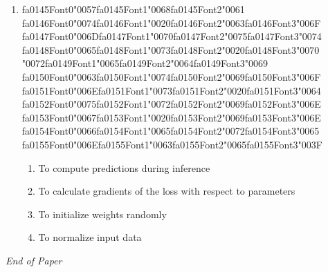 \documentclass[12pt]{article}
\begin{document}
\begin{enumerate}[label=Q\arabic*.]
\item {\csname fa0145Font0\endcsname\char"0057}{\csname fa0145Font1\endcsname\char"0068}{\csname fa0145Font2\endcsname\char"0061} {\csname fa0146Font0\endcsname\char"0074}{\csname fa0146Font1\endcsname\char"0020}{\csname fa0146Font2\endcsname\char"0063}{\csname fa0146Font3\endcsname\char"006F} {\csname fa0147Font0\endcsname\char"006D}{\csname fa0147Font1\endcsname\char"0070}{\csname fa0147Font2\endcsname\char"0075}{\csname fa0147Font3\endcsname\char"0074} {\csname fa0148Font0\endcsname\char"0065}{\csname fa0148Font1\endcsname\char"0073}{\csname fa0148Font2\endcsname\char"0020}{\csname fa0148Font3\endcsname\char"0070} {\char"0072}{\csname fa0149Font1\endcsname\char"0065}{\csname fa0149Font2\endcsname\char"0064}{\csname fa0149Font3\endcsname\char"0069} {\csname fa0150Font0\endcsname\char"0063}{\csname fa0150Font1\endcsname\char"0074}{\csname fa0150Font2\endcsname\char"0069}{\csname fa0150Font3\endcsname\char"006F} {\csname fa0151Font0\endcsname\char"006E}{\csname fa0151Font1\endcsname\char"0073}{\csname fa0151Font2\endcsname\char"0020}{\csname fa0151Font3\endcsname\char"0064} {\csname fa0152Font0\endcsname\char"0075}{\csname fa0152Font1\endcsname\char"0072}{\csname fa0152Font2\endcsname\char"0069}{\csname fa0152Font3\endcsname\char"006E} {\csname fa0153Font0\endcsname\char"0067}{\csname fa0153Font1\endcsname\char"0020}{\csname fa0153Font2\endcsname\char"0069}{\csname fa0153Font3\endcsname\char"006E} {\csname fa0154Font0\endcsname\char"0066}{\csname fa0154Font1\endcsname\char"0065}{\csname fa0154Font2\endcsname\char"0072}{\csname fa0154Font3\endcsname\char"0065} {\csname fa0155Font0\endcsname\char"006E}{\csname fa0155Font1\endcsname\char"0063}{\csname fa0155Font2\endcsname\char"0065}{\csname fa0155Font3\endcsname\char"003F}
\begin{enumerate}[label=(\Alph*)]
    \item To compute predictions during inference
    \item To calculate gradients of the loss with respect to parameters
    \item To initialize weights randomly
    \item To normalize input data
\end{enumerate}
\end{enumerate}

\vfill
\noindent\textit{End of Paper}
\end{document}

